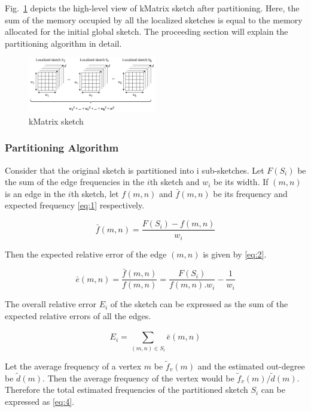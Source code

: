 Fig.~\ref{fig:kmatrix} depicts the high-level view of kMatrix sketch after partitioning. Here, the sum of the memory occupied by all the localized sketches is equal to the memory allocated for the initial global sketch. The proceeding section will explain the partitioning algorithm in detail. 

\begin{figure}[htbp]
    \centerline{\includegraphics[width=0.5\textwidth]{img/kmatrix.png}}
    \caption{kMatrix sketch}
    \label{fig:kmatrix}
\end{figure}

\subsubsection*{Partitioning Algorithm}

Consider that the original sketch is partitioned into i sub-sketches. Let \(F(S_i)\) be the sum of the edge frequencies in the \(i\)th sketch and \(w_i\) be its width. If \((m,n)\) is an edge in the \(i\)th sketch, let \(f(m,n)\) and \(\bar{f}(m,n)\) be its frequency and expected frequency \eqref{eq:1} respectively. 

\begin{equation}
    \bar{f}(m,n) = \frac{F(S_i) - f(m,n)}{w_i}
    \label{eq:1}
\end{equation}

Then the expected relative error of the edge \((m,n)\) is given by \eqref{eq:2}.

\begin{equation}
    \bar{e}(m,n) = \frac{\bar{f}(m,n)}{f(m,n)} = \frac{F(S_i)}{f(m,n) . w_i} - \frac{1}{w_i}
    \label{eq:2}
\end{equation}

The overall relative error \(E_i\) of the sketch can be expressed as the sum of the expected relative errors of all the edges.

\begin{equation}
    E_i = \sum_{(m,n) \in S_i}^{} \bar{e}(m,n)
    \label{eq:3}
\end{equation}

Let the average frequency of a vertex \(m\) be \(\tilde{f}_v(m)\) and the estimated out-degree be \(\tilde{d}(m)\). Then the average frequency of the vertex would be \( \tilde{f}_v(m) / \tilde{d}(m) \). Therefore the total estimated frequencies of the partitioned sketch \(S_i\) can be expressed as \eqref{eq:4}.

